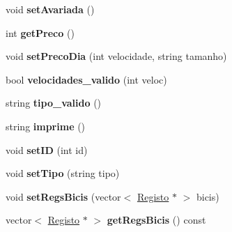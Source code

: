 \begin{DoxyCompactItemize}
\item 
\hypertarget{class_bicicleta_a9e95e5a5744c9385a7a270876bf56f8c}{void {\bfseries set\+Avariada} ()}\label{class_bicicleta_a9e95e5a5744c9385a7a270876bf56f8c}

\item 
\hypertarget{class_bicicleta_adfccbf2a5c83a6c34c3454c78244cffc}{int {\bfseries get\+Preco} ()}\label{class_bicicleta_adfccbf2a5c83a6c34c3454c78244cffc}

\item 
\hypertarget{class_bicicleta_a830e5be0d74c904f9e1b4d0e46fcfbf6}{void {\bfseries set\+Preco\+Dia} (int velocidade, string tamanho)}\label{class_bicicleta_a830e5be0d74c904f9e1b4d0e46fcfbf6}

\item 
\hypertarget{class_bicicleta_a540f165785ed17b710a67c2a59991a48}{bool {\bfseries velocidades\+\_\+valido} (int veloc)}\label{class_bicicleta_a540f165785ed17b710a67c2a59991a48}

\item 
\hypertarget{class_bicicleta_a34990240a07a851793053ca4063a7b8e}{string {\bfseries tipo\+\_\+valido} ()}\label{class_bicicleta_a34990240a07a851793053ca4063a7b8e}

\item 
\hypertarget{class_bicicleta_a900359b6b195db211f479fe5929f8d81}{string {\bfseries imprime} ()}\label{class_bicicleta_a900359b6b195db211f479fe5929f8d81}

\item 
\hypertarget{class_bicicleta_a6e71bf61a37f13c3da8e620760f8f4b9}{void {\bfseries set\+I\+D} (int id)}\label{class_bicicleta_a6e71bf61a37f13c3da8e620760f8f4b9}

\item 
\hypertarget{class_bicicleta_a2318e7e7a22c44283e143f3c2942d721}{void {\bfseries set\+Tipo} (string tipo)}\label{class_bicicleta_a2318e7e7a22c44283e143f3c2942d721}

\item 
\hypertarget{class_bicicleta_ad5861007b46516987cab6fa7cf6adee1}{void {\bfseries set\+Regs\+Bicis} (vector$<$ \hyperlink{class_registo}{Registo} $\ast$ $>$ bicis)}\label{class_bicicleta_ad5861007b46516987cab6fa7cf6adee1}

\item 
\hypertarget{class_bicicleta_a05f9c922b7ebc82a1f223ba8c5d64cc2}{vector$<$ \hyperlink{class_registo}{Registo} $\ast$ $>$ {\bfseries get\+Regs\+Bicis} () const }\label{class_bicicleta_a05f9c922b7ebc82a1f223ba8c5d64cc2}


\end{DoxyCompactItemize}

